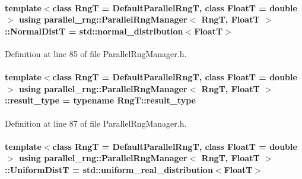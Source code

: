 \paragraph[{\texorpdfstring{Normal\+DistT}{NormalDistT}}]{\setlength{\rightskip}{0pt plus 5cm}template$<$class RngT = Default\+Parallel\+RngT, class FloatT = double$>$ using {\bf parallel\+\_\+rng\+::\+Parallel\+Rng\+Manager}$<$ RngT, FloatT $>$\+::{\bf Normal\+DistT} =  std\+::normal\+\_\+distribution$<$FloatT$>$}\hypertarget{classparallel__rng_1_1ParallelRngManager_a8eebc9754ce2a75faeca6b9736d2872f}{}\label{classparallel__rng_1_1ParallelRngManager_a8eebc9754ce2a75faeca6b9736d2872f}


Definition at line 85 of file Parallel\+Rng\+Manager.\+h.

\paragraph[{\texorpdfstring{result\+\_\+type}{result_type}}]{\setlength{\rightskip}{0pt plus 5cm}template$<$class RngT = Default\+Parallel\+RngT, class FloatT = double$>$ using {\bf parallel\+\_\+rng\+::\+Parallel\+Rng\+Manager}$<$ RngT, FloatT $>$\+::{\bf result\+\_\+type} =  typename Rng\+T\+::result\+\_\+type}\hypertarget{classparallel__rng_1_1ParallelRngManager_a199ad0d83c322a1f4415280002dcb386}{}\label{classparallel__rng_1_1ParallelRngManager_a199ad0d83c322a1f4415280002dcb386}


Definition at line 87 of file Parallel\+Rng\+Manager.\+h.

\paragraph[{\texorpdfstring{Uniform\+DistT}{UniformDistT}}]{\setlength{\rightskip}{0pt plus 5cm}template$<$class RngT = Default\+Parallel\+RngT, class FloatT = double$>$ using {\bf parallel\+\_\+rng\+::\+Parallel\+Rng\+Manager}$<$ RngT, FloatT $>$\+::{\bf Uniform\+DistT} =  std\+::uniform\+\_\+real\+\_\+distribution$<$FloatT$>$}\hypertarget{classparallel__rng_1_1ParallelRngManager_a5df9dbb440b976fbc769d564dfccb597}{}\label{classparallel__rng_1_1ParallelRngManager_a5df9dbb440b976fbc769d564dfccb597}


